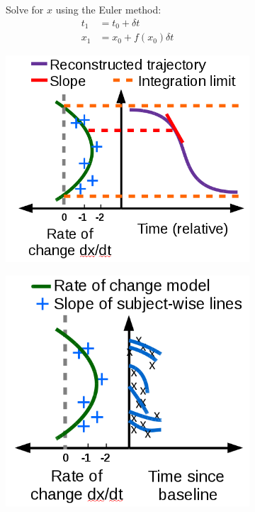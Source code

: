 \documentclass[8pt,xcolor=table]{beamer}
\begin{document}
\begin{frame}
\begin{figure}[H]
\begin{subfigure}{0.3\textwidth}
  Solve for $x$ using the Euler method:
  \begin{align*}
  t_1 &= t_0 + \delta t \\
  x_1 &= x_0 + f(x_0) \delta t \label{eq:dem3}
  \end{align*}
 \end{subfigure}
 \begin{subfigure}{0.34\textwidth}
    \centering
    \includegraphics[width=\textwidth]{demNewFigs/fig5.png}
    \vspace{1em}
 \end{subfigure}
 \begin{subfigure}{0.3\textwidth}
     \centering
     \includegraphics[width=\textwidth]{demNewFigs/fig4.png}
     \vspace{1em}
 \end{subfigure}
 

\end{figure}
\end{frame}
\end{document}
